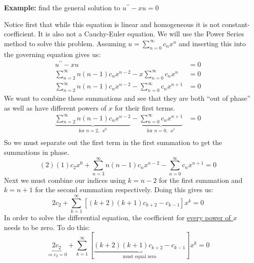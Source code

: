 \vspace{1.5cm}
\noindent\textbf{Example:} find the general solution to $u^{\prime \prime}-xu = 0$

Notice first that while this equation is linear and homogeneous it is not constant-coefficient.  It is also not a Cauchy-Euler equation.  We will use the Power Series method to solve this problem.  Assuming $u=\sum_{n=0}^{\infty}c_n x^n$ and inserting this into the governing equation gives us:
\begin{align*}
u^{\prime \prime}-xu &= 0 \\
\sum\limits_{n=2}^{\infty}n(n-1)c_n x^{n-2} - x\sum\limits_{n=0}^{\infty}c_nx^n &= 0 \\
\sum\limits_{n=2}^{\infty}n(n-1)c_n x^{n-2} - \sum\limits_{n=0}^{\infty}c_n x^{n+1} &=0
\end{align*}
We want to combine these summations and see that they are both ``out of phase'' as well as have different powers of $x$ for their first terms.
\begin{align*}
\underbrace{\sum\limits_{n=2}^{\infty}n(n-1)c_n x^{n-2}}_{\text{for }n=2, \ \ x^0} - \underbrace{\sum\limits_{n=0}^{\infty}c_n x^{n+1}}_{\text{for }n=0, \ \ x^1} &=0 \\
\end{align*}
So we must separate out the first term in the first summation to get the summations in phase.
\begin{equation*}
(2)(1)c_2x^0 + \sum\limits_{n=3}^{\infty}n(n-1)c_n x^{n-2} - \sum\limits_{n=0}^{\infty}c_n x^{n+1} = 0
\end{equation*}
Next we must combine our indices using $k=n-2$ for the first summation and $k=n+1$ for the second summation respectively.  Doing this gives us:
\begin{equation*}
2c_2 + \sum\limits_{k=1}^{\infty} \left[(k+2)(k+1)c_{k+2} - c_{k-1}\right]x^k = 0
\end{equation*}
In order to solve the differential equation, the coefficient for \underline{every power of $x$} needs to be zero.  To do this:
\begin{equation*}
\underbracket{2c_2}_{\Rightarrow c_2=0} + \sum\limits_{k=1}^{\infty} [\underbrace{(k+2)(k+1)c_{k+2} - c_{k-1}}_{\text{must equal zero}}]x^k = 0
\end{equation*}

